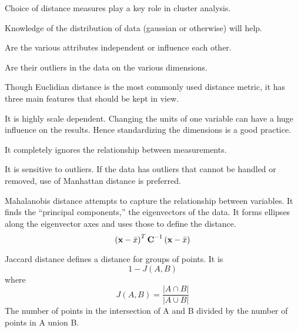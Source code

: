 	\begin{bulletedlist}
		\item Choice of distance measures play a key role in cluster analysis.
		\item Knowledge of the distribution of data (gaussian or otherwise) will help.
		\item Are the various attributes independent or influence each other.
		\item Are their outliers in the data on the various dimensions.
		\item Though Euclidian distance is the most commonly used distance metric, it has three main features that should be kept in view.
		\begin{bulletedlist}
			\item It is highly scale dependent. Changing the units of one variable can have a huge influence on the results. Hence standardizing the dimensions is a good practice.
			\item It completely ignores the relationship between measurements.
			\item It is sensitive to outliers. If the data has outliers that cannot be handled or removed, use of Manhattan distance is preferred.
		\end{bulletedlist}
	\end{bulletedlist}


Mahalanobis distance attempts to capture the relationship between variables.  It finds the ``principal components,'' the eigenvectors of the data.  It forms ellipses along the eigenvector axes and uses those to define the distance.
	\begin{equation}
		\left(\mbox{\boldmath$\mathrm{x}$}-\bar{x}\right)^T \mbox{\boldmath$\mathrm{C}$}^{-1}\left(\mbox{\boldmath$\mathrm{x}$}-\bar{x}\right)
	\end{equation}
	\begin{mathwhere}
	\end{mathwhere}

Jaccard distance defines a distance for groups of points.  It is
	\begin{equation}
		1 - J(A,B)
	\end{equation}
where
	\begin{equation}
		J(A,B) = \frac{\left|A\cap B\right|}{\left|A\cup B\right|}
	\end{equation}
The number of points in the intersection of A and B divided by the number of points in A union B.


